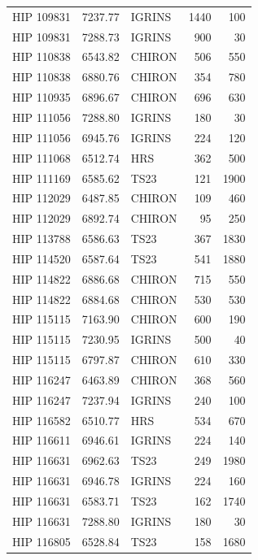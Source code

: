\begin{scriptsize}
\begin{longtable}{|l|rlrr|}
  HIP 109831 &  7237.77 &     IGRINS &     1440 &   100 \\
  HIP 109831 &  7288.73 &     IGRINS &      900 &    30 \\
  HIP 110838 &  6543.82 &     CHIRON &      506 &   550 \\
  HIP 110838 &  6880.76 &     CHIRON &      354 &   780 \\
  HIP 110935 &  6896.67 &     CHIRON &      696 &   630 \\
  HIP 111056 &  7288.80 &     IGRINS &      180 &    30 \\
  HIP 111056 &  6945.76 &     IGRINS &      224 &   120 \\
  HIP 111068 &  6512.74 &        HRS &      362 &   500 \\
  HIP 111169 &  6585.62 &       TS23 &      121 &  1900 \\
  HIP 112029 &  6487.85 &     CHIRON &      109 &   460 \\
  HIP 112029 &  6892.74 &     CHIRON &       95 &   250 \\
  HIP 113788 &  6586.63 &       TS23 &      367 &  1830 \\
  HIP 114520 &  6587.64 &       TS23 &      541 &  1880 \\
  HIP 114822 &  6886.68 &     CHIRON &      715 &   550 \\
  HIP 114822 &  6884.68 &     CHIRON &      530 &   530 \\
  HIP 115115 &  7163.90 &     CHIRON &      600 &   190 \\
  HIP 115115 &  7230.95 &     IGRINS &      500 &    40 \\
  HIP 115115 &  6797.87 &     CHIRON &      610 &   330 \\
  HIP 116247 &  6463.89 &     CHIRON &      368 &   560 \\
  HIP 116247 &  7237.94 &     IGRINS &      240 &   100 \\
  HIP 116582 &  6510.77 &        HRS &      534 &   670 \\
  HIP 116611 &  6946.61 &     IGRINS &      224 &   140 \\
  HIP 116631 &  6962.63 &       TS23 &      249 &  1980 \\
  HIP 116631 &  6946.78 &     IGRINS &      224 &   160 \\
  HIP 116631 &  6583.71 &       TS23 &      162 &  1740 \\
  HIP 116631 &  7288.80 &     IGRINS &      180 &    30 \\
  HIP 116805 &  6528.84 &       TS23 &      158 &  1680 \\

\end{longtable}
\end{scriptsize}

